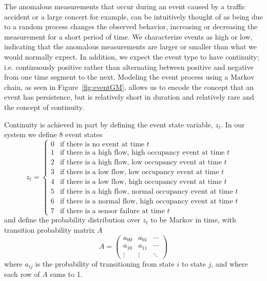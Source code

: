 \documentclass[12pt]{report}
\newcounter{time}
\begin{document}
The anomalous measurements that occur during an event caused by a
traffic accident or a large concert for example, can be intuitively
thought of as being due to a random process changes the observed
behavior, increasing or decreasing the measurement for a short period
of time.  We characterize events as high or low, indicating that the
anomalous measurements are larger or smaller than what we would
normally expect.  In addition, we expect the event type to have
continuity; i.e. continuously positive rather than alternating between
positive and negative from one time segment to the next.  Modeling the
event process using a Markov chain, as seen in
Figure~\ref{fig:eventGM}, allows us to encode the concept that an
event has persistence, but is relatively short in duration and
relatively rare and the concept of continuity.

Continuity is achieved in part by defining the event state variable,
$z_t$.  In our system we define 8 event states
\begin{equation}
 z_t = \begin{cases} 0 & \mbox{if there is no event at time $t$} \\
                      1 & \mbox{if there is a high flow, high occupancy event at time $t$} \\
                      2 & \mbox{if there is a high flow, low occupancy event at time $t$} \\
                      3 & \mbox{if there is a low flow, low occupancy event at time $t$} \\
                      4 & \mbox{if there is a low flow, high occupancy event at time $t$} \\
                      5 & \mbox{if there is a high flow, normal occupancy event at time $t$} \\
                      6 & \mbox{if there is a normal flow, high occupancy event at time $t$} \\
                      7 & \mbox{if there is a sensor failure at time $t$ }
       \end{cases}
\end{equation}
and define the probability distribution over $z_t$ to be Markov in
time, with transition probability matrix $A$
\begin{equation}
  A = \left( \begin{matrix} a_{00} & a_{01} & \cdots \\ a_{10} & a_{11} & \cdots \\ \vdots & \vdots & \ddots  \end{matrix} \right)
\end{equation}\label{singleSensor:transitionMatrix}
where $a_{ij}$ is the probability of transitioning from state $i$ to
state $j$, and where each row of $A$ sums to 1.
\end{document}
